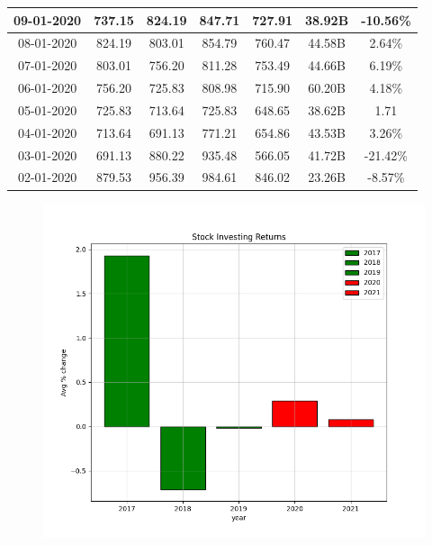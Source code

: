 \begin{table}[H]
{\begin{tabular}{|c|c|c|c|c|c|c|}
        09-01-2020 & 737.15 & 824.19 & 847.71 & 727.91 & 38.92B & -10.56\% \\ \hline
        08-01-2020 & 824.19 & 803.01 & 854.79 & 760.47 & 44.58B & 2.64\% \\ \hline
        07-01-2020 & 803.01 & 756.20 & 811.28 & 753.49 & 44.66B & 6.19\% \\ \hline
        06-01-2020 & 756.20 & 725.83 & 808.98 & 715.90 & 60.20B & 4.18\% \\ \hline
        05-01-2020 & 725.83 & 713.64 & 725.83 & 648.65 & 38.62B & 1.71\\
        \hline
         04-01-2020 & 713.64 & 691.13 & 771.21 & 654.86 & 43.53B & 3.26\% \\
         \hline
        03-01-2020 & 691.13 & 880.22 & 935.48 & 566.05 & 41.72B & -21.42\% \\
        \hline
        02-01-2020 & 879.53 & 956.39 & 984.61 & 846.02 & 23.26B & -8.57\% \\
        
        \bottomrule
    \end{tabular}
    }
\cite{LQ45_data}
\end{table}

\begin{figure}[H]
    \centering
    \includegraphics[width = 1\textwidth ]{figures/stock_returns.png}
\end{figure}



